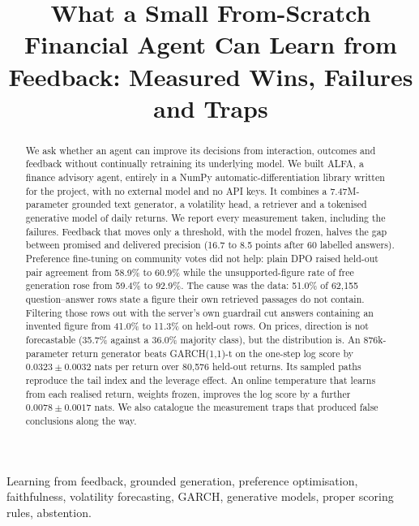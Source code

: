 \documentclass[conference]{IEEEtran}
\begin{document}
\title{What a Small From-Scratch Financial Agent Can Learn from Feedback: Measured Wins, Failures and Traps}

\author{
}

\maketitle

\begin{abstract}
We ask whether an agent can improve its decisions from interaction, outcomes and feedback without
continually retraining its underlying model. We built ALFA, a finance advisory agent, entirely in a
NumPy automatic-differentiation library written for the project, with no external model and no API
keys. It combines a 7.47M-parameter grounded text generator, a volatility head, a retriever and a
tokenised generative model of daily returns. We report every measurement taken, including the
failures. Feedback that moves only a threshold, with the model frozen, halves the gap between
promised and delivered precision (16.7 to 8.5 points after 60 labelled answers). Preference
fine-tuning on community votes did not help: plain DPO raised held-out pair agreement from 58.9\% to
60.9\% while the unsupported-figure rate of free generation rose from 59.4\% to 92.9\%. The cause was
the data: 51.0\% of 62{,}155 question--answer rows state a figure their own retrieved passages do not
contain. Filtering those rows out with the server's own guardrail cut answers containing an invented
figure from 41.0\% to 11.3\% on held-out rows. On prices, direction is not forecastable (35.7\% against a 36.0\% majority class), but the
distribution is. An 876k-parameter return generator beats GARCH(1,1)-t on the one-step log score by
$0.0323 \pm 0.0032$ nats per return over 80{,}576 held-out returns. Its sampled paths reproduce the
tail index and the leverage effect. An online temperature that learns from each realised return,
weights frozen, improves the log score by a further $0.0078 \pm 0.0017$ nats. We also catalogue the
measurement traps that produced false conclusions along the way.
\end{abstract}

\begin{IEEEkeywords}
Learning from feedback, grounded generation, preference optimisation, faithfulness, volatility
forecasting, GARCH, generative models, proper scoring rules, abstention.
\end{IEEEkeywords}
\end{document}
